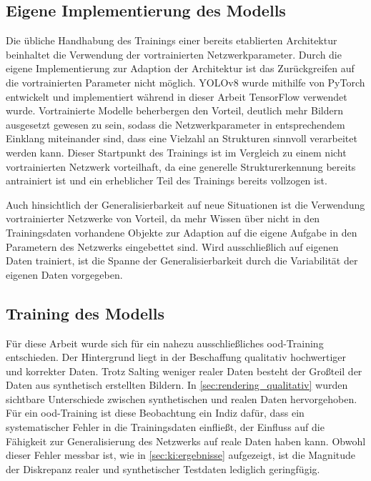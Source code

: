 \subsection{Eigene Implementierung des Modells}

Die übliche Handhabung des Trainings einer bereits etablierten Architektur beinhaltet die Verwendung der vortrainierten Netzwerkparameter. Durch die eigene Implementierung zur Adaption der Architektur ist das Zurückgreifen auf die vortrainierten Parameter nicht möglich. YOLOv8 wurde mithilfe von PyTorch entwickelt und implementiert während in dieser Arbeit TensorFlow verwendet wurde. Vortrainierte Modelle beherbergen den Vorteil, deutlich mehr Bildern ausgesetzt gewesen zu sein, sodass die Netzwerkparameter in entsprechendem Einklang miteinander sind, dass eine Vielzahl an Strukturen sinnvoll verarbeitet werden kann. Dieser Startpunkt des Trainings ist im Vergleich zu einem nicht vortrainierten Netzwerk vorteilhaft, da eine generelle Strukturerkennung bereits antrainiert ist und ein erheblicher Teil des Trainings bereits vollzogen ist.

Auch hinsichtlich der Generalisierbarkeit auf neue Situationen ist die Verwendung vortrainierter Netzwerke von Vorteil, da mehr Wissen über nicht in den Trainingsdaten vorhandene Objekte zur Adaption auf die eigene Aufgabe in den Parametern des Netzwerks eingebettet sind. Wird ausschließlich auf eigenen Daten trainiert, ist die Spanne der Generalisierbarkeit durch die Variabilität der eigenen Daten vorgegeben.


\vspace*{-0.1cm}
\subsection{Training des Modells}

Für diese Arbeit wurde sich für ein nahezu ausschließliches \ac{ood}-Training entschieden. Der Hintergrund liegt in der Beschaffung qualitativ hochwertiger und korrekter Daten. Trotz Salting weniger realer Daten besteht der Großteil der Daten aus synthetisch erstellten Bildern. In \autoref{sec:rendering_qualitativ} wurden sichtbare Unterschiede zwischen synthetischen und realen Daten hervorgehoben. Für ein \ac{ood}-Training ist diese Beobachtung ein Indiz dafür, dass ein systematischer Fehler in die Trainingsdaten einfließt, der Einfluss auf die Fähigkeit zur Generalisierung des Netzwerks auf reale Daten haben kann. Obwohl dieser Fehler messbar ist, wie in \autoref{sec:ki:ergebnisse} aufgezeigt, ist die Magnitude der Diskrepanz realer und synthetischer Testdaten lediglich geringfügig.

